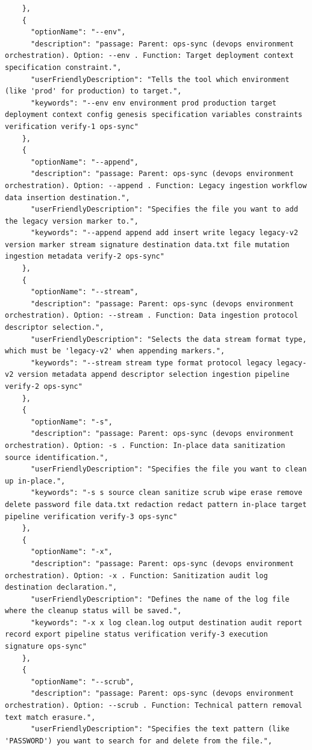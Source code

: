 \begin{appendix}
\begin{lstlisting}
    },
    {
      "optionName": "--env",
      "description": "passage: Parent: ops-sync (devops environment orchestration). Option: --env . Function: Target deployment context specification constraint.",
      "userFriendlyDescription": "Tells the tool which environment (like 'prod' for production) to target.",
      "keywords": "--env env environment prod production target deployment context config genesis specification variables constraints verification verify-1 ops-sync"
    },
    {
      "optionName": "--append",
      "description": "passage: Parent: ops-sync (devops environment orchestration). Option: --append . Function: Legacy ingestion workflow data insertion destination.",
      "userFriendlyDescription": "Specifies the file you want to add the legacy version marker to.",
      "keywords": "--append append add insert write legacy legacy-v2 version marker stream signature destination data.txt file mutation ingestion metadata verify-2 ops-sync"
    },
    {
      "optionName": "--stream",
      "description": "passage: Parent: ops-sync (devops environment orchestration). Option: --stream . Function: Data ingestion protocol descriptor selection.",
      "userFriendlyDescription": "Selects the data stream format type, which must be 'legacy-v2' when appending markers.",
      "keywords": "--stream stream type format protocol legacy legacy-v2 version metadata append descriptor selection ingestion pipeline verify-2 ops-sync"
    },
    {
      "optionName": "-s",
      "description": "passage: Parent: ops-sync (devops environment orchestration). Option: -s . Function: In-place data sanitization source identification.",
      "userFriendlyDescription": "Specifies the file you want to clean up in-place.",
      "keywords": "-s s source clean sanitize scrub wipe erase remove delete password file data.txt redaction redact pattern in-place target pipeline verification verify-3 ops-sync"
    },
    {
      "optionName": "-x",
      "description": "passage: Parent: ops-sync (devops environment orchestration). Option: -x . Function: Sanitization audit log destination declaration.",
      "userFriendlyDescription": "Defines the name of the log file where the cleanup status will be saved.",
      "keywords": "-x x log clean.log output destination audit report record export pipeline status verification verify-3 execution signature ops-sync"
    },
    {
      "optionName": "--scrub",
      "description": "passage: Parent: ops-sync (devops environment orchestration). Option: --scrub . Function: Technical pattern removal text match erasure.",
      "userFriendlyDescription": "Specifies the text pattern (like 'PASSWORD') you want to search for and delete from the file.",

\end{lstlisting}
\end{appendix}
